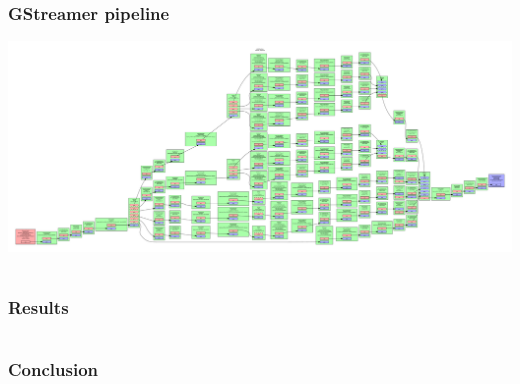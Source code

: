 \documentclass{beamer}
\begin{document}
\begin{frame}
	\frametitle{GStreamer pipeline}
	\includegraphics[width=\textwidth]{figures/pipeline}
\end{frame}


\section[Results]{}


\begin{frame}
\frametitle{Results}
\end{frame}


\section[Conclusion]{}


\begin{frame}
\frametitle{Conclusion}
\end{frame}
\end{document}
